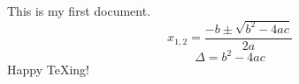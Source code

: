 \documentclass{article}
\begin{document}
This is my first document.
\begin{equation}
  x_{1,2} = \frac{-b \pm \sqrt{b^2 - 4ac}}{2a}
\end{equation}
\begin{equation}
  \Delta = b^{2}-4ac
\end{equation}
Happy \TeX ing!
\end{document}
